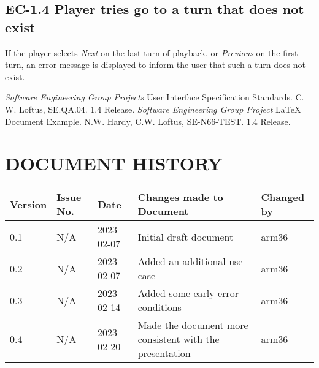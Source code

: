\documentclass{project}
\begin{document}
\subsection{EC-1.4 Player tries go to a turn that does not exist}
If the player selects \emph{Next} on the last turn of playback, or \emph{Previous} on the first turn, an error message is displayed to inform the user that such a turn does not exist.
\clearpage
{}
\begin{thebibliography}{5}
 \emph{Software Engineering Group Projects}
User Interface Specification Standards.
C. W. Loftus, SE.QA.04. 1.4 Release.
 \emph{Software Engineering Group Project}
LaTeX Document Example.
N.W. Hardy, C.W. Loftus, SE-N66-TEST. 1.4 Release.
\end{thebibliography}
\section*{DOCUMENT HISTORY}
\begin{tabular}{|l | l | l | l | l |}
\hline
Version & Issue No. & Date & Changes made to Document & Changed by \\
\hline
0.1 & N/A & 2023-02-07 & Initial draft document & arm36 \\
\hline
0.2 & N/A & 2023-02-07 & Added an additional use case & arm36 \\
\hline
0.3 & N/A & 2023-02-14 & Added some early error conditions & arm36 \\
\hline
0.4 & N/A & 2023-02-20 & Made the document more consistent with the presentation & arm36 \\
\hline
\end{tabular}
\label{thelastpage}
\end{document}
